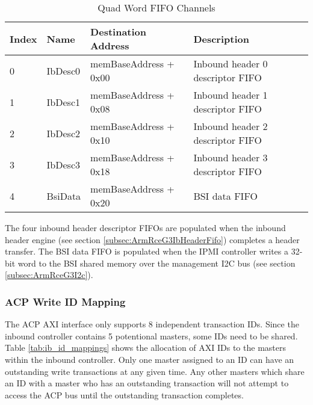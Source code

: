 \documentclass[11pt]{article}
\begin{document}
\begin{table}[H]
\small
\centering
   \begin{tabular}{| l | l | l | l | }
      \hline \textbf{Index} & \textbf{Name}  & \textbf{Destination Address} & \textbf{Description} \\
      \hline 0              & IbDesc0        & memBaseAddress + 0x00 &  Inbound header 0 descriptor FIFO \\
      \hline 1              & IbDesc1        & memBaseAddress + 0x08 &  Inbound header 1 descriptor FIFO \\
      \hline 2              & IbDesc2        & memBaseAddress + 0x10 &  Inbound header 2 descriptor FIFO \\
      \hline 3              & IbDesc3        & memBaseAddress + 0x18 &  Inbound header 3 descriptor FIFO \\
      \hline 4              & BsiData        & memBaseAddress + 0x20 &  BSI data FIFO                       \\
      \hline
   \end{tabular}
   \caption{Quad Word FIFO Channels}
   \label{tab:ib_qword_mappings}
\end{table}

The four inbound header descriptor FIFOs are populated when the inbound header engine (see section \ref{subsec:ArmRceG3IbHeaderFifo})
completes a header transfer. The BSI data FIFO is populated when the IPMI controller writes a 32-bit word to the
BSI shared memory over the management I2C bus (see section \ref{subsec:ArmRceG3I2c}). 

\subsubsection{ACP Write ID Mapping}

The ACP AXI interface only supports 8 independent transaction IDs. Since the inbound controller contains 5 potentional masters, some
IDs need to be shared. Table \ref{tab:ib_id_mappings} shows the allocation of AXI IDs to the masters within the inbound
controller. Only one master assigned to an ID can have an outstanding write transactions at any given time. Any other
masters which share an ID with a master who has an outstanding transaction will not attempt to access the ACP bus
until the outstanding transaction completes.
\end{document}
